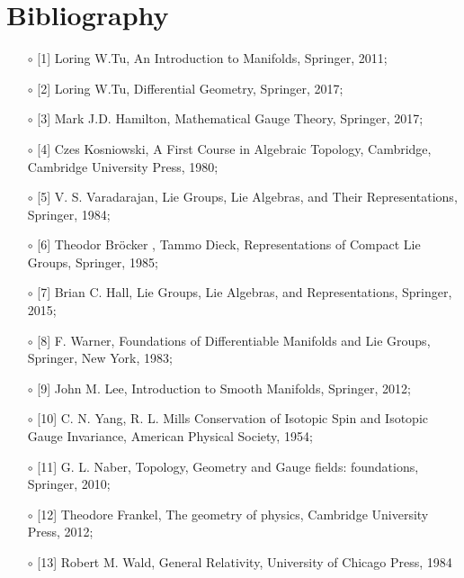 \documentclass[12pt,a4paper]{report}
\theoremstyle{definition}
\theoremstyle{Theorem}
\theoremstyle{definition}
\theoremstyle{definition}
\begin{document}
	\chapter*{Bibliography}
	\begin{itemize}
		\item[$\circ$] [1] Loring W.Tu, An Introduction to Manifolds, Springer, 2011;
		\item[$\circ$] [2] Loring W.Tu, Differential Geometry, Springer, 2017;
		\item[$\circ$] [3] Mark J.D. Hamilton, Mathematical Gauge Theory, Springer, 2017;
		\item[$\circ$] [4] Czes Kosniowski, A First Course in Algebraic Topology, Cambridge, Cambridge University Press, 1980;
		\item[$\circ$] [5] V. S. Varadarajan, Lie Groups, Lie Algebras, and Their Representations, Springer, 1984;
		\item[$\circ$] [6] Theodor Bröcker , Tammo Dieck, Representations of Compact Lie Groups, Springer, 1985;
		\item[$\circ$] [7] Brian C. Hall, Lie Groups, Lie Algebras, and Representations, Springer, 2015;
		\item[$\circ$] [8] F. Warner, Foundations of Differentiable Manifolds and Lie Groups, Springer, New York, 1983;
		\item[$\circ$] [9] John M. Lee, Introduction to Smooth Manifolds, Springer, 2012;
		\item[$\circ$] [10] C. N. Yang, R. L. Mills Conservation of Isotopic Spin and Isotopic Gauge Invariance, American Physical Society, 1954;
		\item[$\circ$] [11] G. L. Naber,
		Topology, Geometry and Gauge fields: foundations, Springer, 2010;
		\item[$\circ$] [12] Theodore Frankel, The geometry of physics, 
		Cambridge University Press, 2012;
		\item[$\circ$] [13] Robert M. Wald, General Relativity, University of Chicago Press, 1984
		
	\end{itemize}
	
\end{document}
